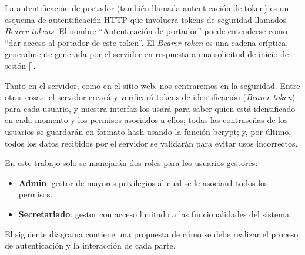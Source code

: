 
La autentificación de portador (también llamada autenticación de token) es un esquema de autentificación HTTP que involucra tokens de seguridad llamados \textit{Bearer tokens}. El nombre ``Autenticación de portador'' puede entenderse como ``dar acceso al portador de este token''. El \textit{Bearer token} es una cadena críptica, generalmente generada por el servidor en respuesta a una solicitud de inicio de sesión [\cite{98}].

Tanto en el servidor, como en el sitio web, nos centraremos en la seguridad. Entre otras cosas: el servidor creará y verificará tokens de identificación (\textit{Bearer token}) para cada usuario, y nuestra interfaz los usará para saber quien está identificado en cada momento y los permisos asociados a ellos; todas las contraseñas de los usuarios se guardarán en formato hash usando la función bcrypt; y, por último, todos los datos recibidos por el servidor se validarán para evitar usos incorrectos.

En este trabajo solo se manejarán dos roles para los usuarios gestores:

\begin{itemize}
\item \textbf{Admin}: gestor de mayores privilegios al cual se le asocian1 todos los permisos.
\item \textbf{Secretariado}: gestor con acceso limitado a las funcionalidades del sistema.
\end{itemize}


El siguiente diagrama contiene una propuesta de cómo se debe realizar el proceso de autenticación y la interacción de cada parte.

